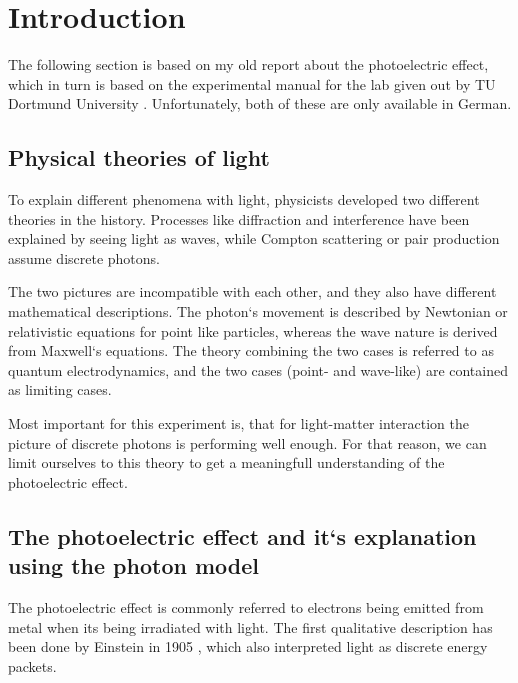 \section{Introduction}
\label{sec:introduction}
The following section is based on my old report about the photoelectric effect, which in turn is
based on the experimental manual for the lab given out by TU Dortmund University
\cite{V500,anleitung}. Unfortunately,
both of these are only available in German.

\subsection{Physical theories of light}
\label{sec:intr:theory}
To explain different phenomena with light, physicists developed two different theories in the
history. Processes like diffraction and interference have been explained by seeing light as waves,
while Compton scattering or pair production assume discrete photons. 

The two pictures are incompatible with each other, and they also have different mathematical
descriptions. The photon`s movement is described by Newtonian or relativistic equations for
point like particles, whereas the wave nature is derived from Maxwell`s equations. The theory
combining the two cases is referred to as quantum electrodynamics, and the two cases (point- and 
wave-like) are contained as limiting cases.

Most important for this experiment is, that for light-matter interaction the picture of discrete
photons is performing well enough. For that reason, we can limit ourselves to this theory to get a
meaningfull understanding of the photoelectric effect.

\subsection{The photoelectric effect and it`s explanation using the photon model}
\label{sec:intr:photoeffect}
The photoelectric effect is commonly referred to electrons being emitted from metal when its being
irradiated with light. The first qualitative description has been done by Einstein in 1905
\cite{https://doi.org/10.1002/andp.19053220607}, which also interpreted light as discrete energy
packets.

